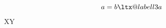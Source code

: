 \documentclass{article}
\begin{document}
\begin{equation} a = b \ltx@label{l3a} \end{equation}
XY
\end{document}
